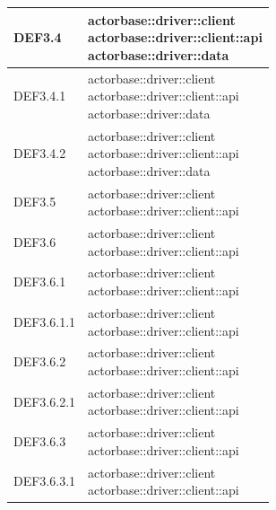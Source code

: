 \documentclass{scalatekids-article}
\begin{document}
\begin{longtable}[H]{|p{6cm}|p{11cm}|}
DEF3.4 & \multiLineCell[t]{actorbase::driver::client\\actorbase::driver::client::api\\actorbase::driver::data\\}\\
\hline
DEF3.4.1 & \multiLineCell[t]{actorbase::driver::client\\actorbase::driver::client::api\\actorbase::driver::data\\}\\
\hline
DEF3.4.2 & \multiLineCell[t]{actorbase::driver::client\\actorbase::driver::client::api\\actorbase::driver::data\\}\\
\hline
DEF3.5 & \multiLineCell[t]{actorbase::driver::client\\actorbase::driver::client::api\\}\\
\hline
DEF3.6 & \multiLineCell[t]{actorbase::driver::client\\actorbase::driver::client::api\\}\\
\hline
DEF3.6.1 & \multiLineCell[t]{actorbase::driver::client\\actorbase::driver::client::api\\}\\
\hline
DEF3.6.1.1 & \multiLineCell[t]{actorbase::driver::client\\actorbase::driver::client::api\\}\\
\hline
DEF3.6.2 & \multiLineCell[t]{actorbase::driver::client\\actorbase::driver::client::api\\}\\
\hline
DEF3.6.2.1 & \multiLineCell[t]{actorbase::driver::client\\actorbase::driver::client::api\\}\\
\hline
DEF3.6.3 & \multiLineCell[t]{actorbase::driver::client\\actorbase::driver::client::api\\}\\
\hline
DEF3.6.3.1 & \multiLineCell[t]{actorbase::driver::client\\actorbase::driver::client::api\\}\\
\hline

\end{longtable}
\end{document}
